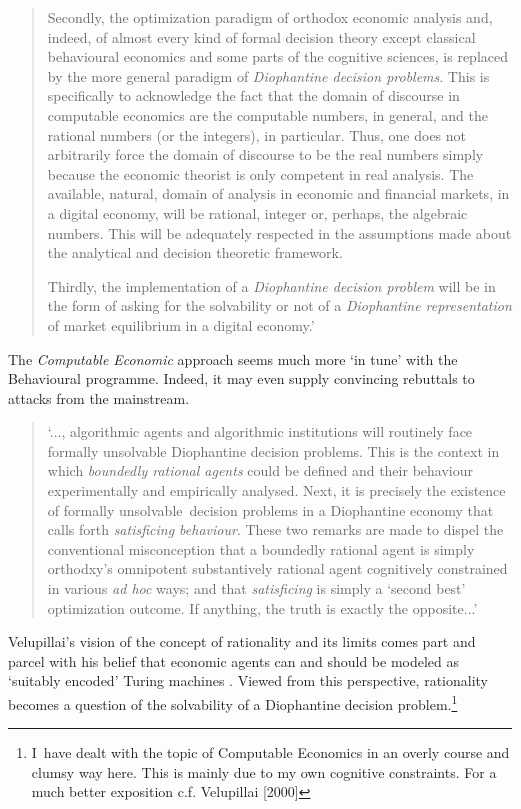 \documentclass{ucthesis}
\begin{document}
\begin{quotation}
\qquad Secondly, the optimization paradigm of orthodox economic analysis
and, indeed, of almost every kind of formal decision theory except classical
behavioural economics and some parts of the cognitive sciences, is replaced
by the more general paradigm of \textit{Diophantine decision problems}. This
is specifically to acknowledge the fact that the domain of discourse in
computable economics are the computable numbers, in general, and the
rational numbers (or the integers), in particular. Thus, one does not
arbitrarily force the domain of discourse to be the real numbers simply
because the economic theorist is only competent in real analysis. The
available, natural, domain of analysis in economic and financial markets, in
a digital economy, will be rational, integer or, perhaps, the algebraic
numbers. This will be adequately respected in the assumptions made about the
analytical and decision theoretic framework.

\qquad Thirdly, the implementation of a \textit{Diophantine decision problem}
will be in the form of asking for the solvability or not of a \textit{%
Diophantine representation} of market equilibrium in a digital economy.'\cite%
[pp. 23]{Vela 2005}
\end{quotation}

The \textit{Computable Economic} approach seems much more `in tune' with the
Behavioural programme. Indeed, it may even supply convincing rebuttals to
attacks from the mainstream.

\begin{quotation}
`..., algorithmic agents and algorithmic institutions will routinely face
formally unsolvable Diophantine decision problems. This is the context in
which \textit{boundedly rational agents }could be defined and their
behaviour experimentally and empirically analysed. Next, it is precisely the
existence of formally unsolvable\ decision problems in a Diophantine economy
that calls forth \textit{satisficing behaviour}. These two remarks are made
to dispel the conventional misconception that a boundedly rational agent is
simply orthodxy's omnipotent substantively rational agent cognitively
constrained in various \textit{ad hoc} ways; and that \textit{satisficing}
is simply a `second best' optimization outcome. If anything, the truth is
exactly the opposite...' \cite[pp. 25, italics in the original]{Vela 2005}
\end{quotation}

Velupillai's vision of the concept of rationality and its limits comes part
and parcel with his belief that economic agents can and should be modeled as
`suitably encoded' Turing machines \cite[cf., 2000, ch. 3 \& 4]{Vela 2000}.
Viewed from this perspective, rationality becomes a question of the
solvability of a Diophantine decision problem.\footnote{%
I\ have dealt with the topic of Computable Economics in an overly course and
clumsy way here. This is mainly due to my own cognitive constraints. For a
much better exposition c.f. Velupillai [2000]
\par
{}}
\end{document}
